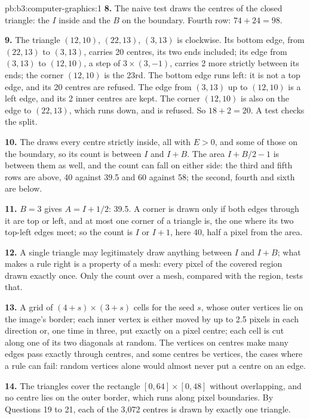 \begin{solution}{pb:b3:computer-graphics:1}
\textbf{8.} The naive test draws the centres of the closed triangle: the $I$ inside and the $B$ on the boundary. Fourth row: $74 + 24 = 98$.

\textbf{9.} The triangle $(12, 10)$, $(22, 13)$, $(3, 13)$ is clockwise. Its bottom edge, from $(22, 13)$ to $(3, 13)$, carries 20 centres, its two ends included; its edge from $(3, 13)$ to $(12, 10)$, a step of $3 \times (3, -1)$, carries 2 more strictly between its ends; the corner $(12, 10)$ is the 23rd. The bottom edge runs left: it is not a top edge, and its 20 centres are refused. The edge from $(3, 13)$ up to $(12, 10)$ is a left edge, and its 2 inner centres are kept. The corner $(12, 10)$ is also on the edge to $(22, 13)$, which runs down, and is refused. So $18 + 2 = 20$. A test checks the split.

\textbf{10.} The  draws every centre strictly inside, all with $E > 0$, and some of those on the boundary, so its count is between $I$ and $I + B$. The area $I + B/2 - 1$ is between them as well, and the count can fall on either side: the third and fifth rows are above, 40 against 39.5 and 60 against 58; the second, fourth and sixth are below.

\textbf{11.} $B = 3$ gives $A = I + 1/2$: 39.5. A corner is drawn only if both edges through it are top or left, and at most one corner of a triangle is, the one where its two top-left edges meet; so the count is $I$ or $I + 1$, here 40, half a pixel from the area.

\textbf{12.} A single triangle may legitimately draw anything between $I$ and $I + B$; what makes a rule right is a property of a mesh: every pixel of the covered region drawn exactly once. Only the count over a mesh, compared with the region, tests that.

\textbf{13.} A grid of $(4 + s) \times (3 + s)$ cells for the seed $s$, whose outer vertices lie on the image's border; each inner vertex is either moved by up to 2.5 pixels in each direction or, one time in three, put exactly on a pixel centre; each cell is cut along one of its two diagonals at random. The vertices on centres make many edges pass exactly through centres, and some centres be vertices, the cases where a rule can fail: random vertices alone would almost never put a centre on an edge.

\textbf{14.} The triangles cover the rectangle $[0, 64] \times [0, 48]$ without overlapping, and no centre lies on the outer border, which runs along pixel boundaries. By Questions 19 to 21, each of the 3,072 centres is drawn by exactly one triangle.


\end{solution}
